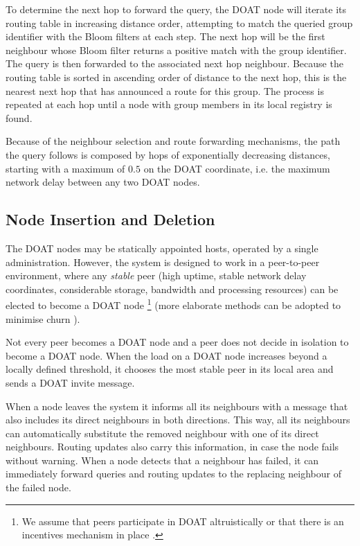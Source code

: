 To determine the next hop to forward the query, the DOAT node
will iterate its routing table in increasing distance order, attempting to
match the queried group identifier with the Bloom filters at each step.
The next hop will be the first neighbour whose Bloom filter returns a positive
match with the group identifier. The query is then forwarded to the
associated next hop neighbour. Because the routing table is sorted in ascending order
of distance to the next hop, this is the nearest next hop that has
announced a route for this group. The process is repeated at
each hop until a node with group members in its 
local registry is found.

Because of the neighbour selection and route forwarding mechanisms, the
path the query follows is composed by hops of exponentially decreasing
distances, starting with a maximum of $0.5$ on the DOAT coordinate, i.e.
the maximum network delay between any two DOAT nodes.




\subsection{Node Insertion and Deletion}

The DOAT nodes may be statically appointed hosts, operated by a single
administration. However, the system is designed to work in a peer-to-peer
environment, where any \emph{stable} peer (high uptime, stable network
delay coordinates, considerable storage, bandwidth and processing
resources) can be elected to become a DOAT node
\footnote{We assume that
peers participate in DOAT altruistically or that there is an
incentives mechanism in place \cite{Incentives}.}
(more elaborate methods can be adopted to minimise
churn \cite{godfrey}).

Not every peer becomes a DOAT node and a peer does not decide in isolation
to become a DOAT node. When the load on a DOAT
node increases 
beyond a
locally defined threshold, it chooses the most stable peer in its local
area and sends a
DOAT invite message.


When a node leaves the system
it informs all its neighbours with a message that also includes its
direct neighbours in both directions. This way, all its neighbours can automatically
substitute the removed neighbour with one of its direct neighbours.
Routing updates also carry this information, in case the node fails without
warning. When a node detects that a neighbour has failed, it can
immediately forward queries and routing updates to the 
replacing neighbour of the failed node.

